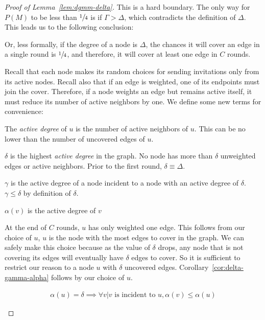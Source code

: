 \begin{proof}[Proof of Lemma~\ref{lem:dgmm-delta}]
This is a hard boundary. The only way for $P(M)$ to be less than $\sfrac{1}{4}$ is if $\Gamma > \Delta$, which contradicts the definition of $\Delta$. This leads us to the following conclusion:



Or, less formally, if the degree of a node is $\Delta$, the chances it will cover an edge in a single round is $\sfrac{1}{4}$, and therefore, it will cover at least one edge in $C$ rounds.

Recall that each node makes its random choices for sending invitations only from its active nodes. Recall also that if an edge is weighted, one of its endpoints must join the cover. Therefore, if a node weights an edge but remains active itself, it must reduce its number of active neighbors by one. We define some new terms for convenience:
\begin{ldef}
The {\em active degree} of $u$ is the number of active neighbors of $u$. This can be no lower than the number of uncovered edges of $u$.
\end{ldef}
\begin{ldef}
$\delta$ is the highest {\em active degree} in the graph. No node has more than $\delta$ unweighted edges or active neighbors. Prior to the first round, $\delta \equiv \Delta$.
\end{ldef}
\begin{ldef}
$\gamma$ is the active degree of a node incident to a node with an active degree of $\delta$. $\gamma \le \delta$ by definition of $\delta$.
\end{ldef}
\begin{ldef}
$\alpha(v)$ is the active degree of $v$
\end{ldef} 

At the end of $C$ rounds, $u$ has only weighted one edge. This follows from our choice of $u$, $u$ is the node with the most edges to cover in the graph. We can safely make this choice because as the value of $\delta$ drops, any node that is not covering its edges will eventually have $\delta$ edges to cover. So it is sufficient to restrict our reason to a node $u$ with $\delta$ uncovered edges. Corollary~\ref{cor:delta-gamma-alpha} follows by our choice of $u$.

\begin{cor}
\label{cor:delta-gamma-alpha}
\begin{align*}
\alpha(u) = \delta \implies \forall v | v \text{ is incident to } u, \alpha(v) \le \alpha(u)
\end{align*}
\end{cor}


\end{proof}
